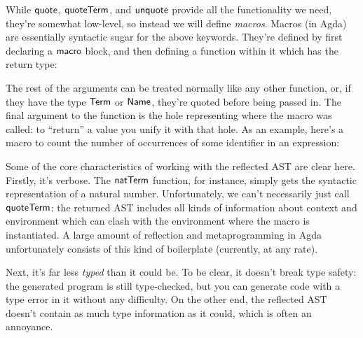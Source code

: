 \documentclass[draft, twocolumn]{article}
\theoremstyle{definition}
\theoremstyle{definition}
\begin{document}
While \(\AgdaKeyword{quote}\), \(\AgdaKeyword{quoteTerm}\), and
\(\AgdaKeyword{unquote}\) provide all the functionality we need, they're
somewhat low-level, so instead we will define \emph{macros}. Macros (in Agda)
are essentially syntactic sugar for the above keywords. They're defined by first
declaring a \(\AgdaKeyword{macro}\) block, and then defining a function within
it which has the return type:

The rest of the arguments can be treated normally like any other function, or,
if they have the type \(\AgdaDatatype{Term}\) or \(\AgdaDatatype{Name}\),
they're quoted before being passed in. The final argument to the function is the
hole representing where the macro was called: to ``return'' a value you unify
it with that hole. As an example, here's a macro to count the number of
occurrences of some identifier in an expression:

Some of the core characteristics of working with the reflected AST are clear
here. Firstly, it's verbose. The \(\AgdaFunction{natTerm}\) function, for
instance, simply gets the syntactic representation of a natural number.
Unfortunately, we can't necessarily just call \(\AgdaKeyword{quoteTerm}\): the
returned AST includes all kinds of information about context and environment
which can clash with the environment where the macro is instantiated. A large
amount of reflection and metaprogramming in Agda unfortunately consists of this
kind of boilerplate (currently, at any rate).

Next, it's far less \emph{typed} than it could be. To be clear, it doesn't break
type safety: the generated program is still type-checked, but you can generate
code with a type error in it without any difficulty. On the other end, the
reflected AST doesn't contain as much type information as it could, which is
often an annoyance. 
\end{document}
